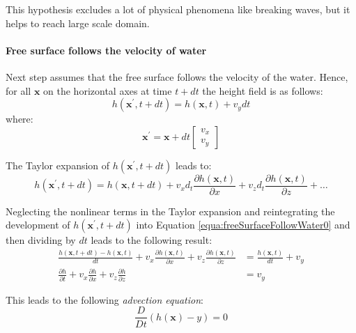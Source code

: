 \documentclass[final]{jcgt}
\begin{document}
This hypothesis excludes a lot of physical phenomena like breaking waves, but it helps to reach large scale domain.

\paragraph{Free surface follows the velocity of water}
Next step assumes that the free surface follows the velocity of the water.
Hence, for all $\mathbf x$ on the horizontal axes at time $t + dt$ the height field is as follows:
\begin{equation}
	h(\mathbf{x^{\prime}}, t + dt) = h(\mathbf x, t) + {v_y}dt\label{equa:freeSurfaceFollowWater0}
\end{equation}
where:
\begin{equation}
	\mathbf{x^{\prime}} = \mathbf x + dt\left[\begin{array}{c}v_x\\ v_y\end{array}\right]
	\label{equa:freeSurfaceFollowWater1}
\end{equation}

The Taylor expansion of $h(\mathbf{x^{\prime}}, t + dt)$ leads to:
\begin{equation}
	h(\mathbf{x^{\prime}}, t + dt) = h(\mathbf{x}, t + dt) + v_xd_t\frac{\partial h(\mathbf{x}, t)}{\partial x} + v_zd_t\frac{\partial h(\mathbf{x}, t)}{\partial z} + \ldots
\end{equation}

Neglecting the nonlinear terms in the Taylor expansion and reintegrating the development of $h(\mathbf{x^{\prime}}, t + dt)$ into Equation \ref{equa:freeSurfaceFollowWater0} and then dividing by $dt$ leads to the following result:
\begin{equation}
	\begin{aligned}
		\frac{h(\mathbf x, t + dt) - h(\mathbf x, t)}{dt} + v_x\frac{\partial h(\mathbf x, t)}{\partial x} + v_z\frac{\partial h(\mathbf x, t)}{\partial z} & = \frac{h(\mathbf x, t)}{dt} + v_y \\
		\frac{\partial h}{\partial t} + v_x\frac{\partial h}{\partial x} + v_z\frac{\partial h}{\partial z}                                                 & = v_y
	\end{aligned}
\end{equation}

This leads to the following \emph{advection equation}:
\begin{equation}
	\frac{D}{Dt}(h(\mathbf x) - y) = 0
	\label{equa:advection}
\end{equation}
\end{document}
